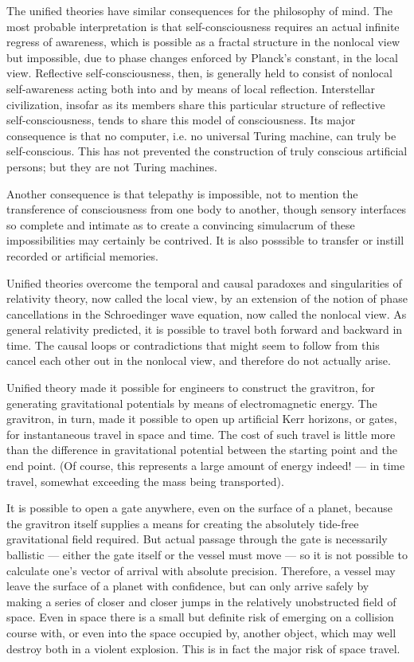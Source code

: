 \documentclass[english,11pt,letterpaper,onecolumn]{scrbook}
\begin{document}
	The unified theories have similar consequences for the philosophy of mind.  The most probable interpretation is that self-consciousness requires an actual infinite regress of awareness, which is possible as a fractal structure in the nonlocal view but impossible, due to phase changes enforced by Planck's constant, in the local view.  Reflective self-consciousness, then, is generally held to consist of nonlocal self-awareness acting both into and by means of local reflection.  Interstellar civilization, insofar as its members share this particular structure of reflective self-consciousness, tends to share this model of consciousness.  Its major consequence is that no computer, i.e. no universal Turing machine, can truly be self-conscious.  This has not prevented the construction of truly conscious artificial persons; but they are not Turing machines.  

	Another consequence is that telepathy is impossible, not to mention the transference of consciousness from one body to another, though sensory interfaces so complete and intimate as to create a convincing simulacrum of these impossibilities may certainly be contrived.  It is also posssible to transfer or instill recorded or artificial memories.

	Unified theories overcome the temporal and causal paradoxes and singularities of relativity theory, now called the local view, by an extension of the notion of phase cancellations in the Schroedinger wave equation, now called the nonlocal view.  As general relativity predicted, it is possible to travel both forward and backward in time.  The causal loops or contradictions that might seem to follow from this cancel each other out in the nonlocal view, and therefore do not actually arise.

	Unified theory made it possible for engineers to construct the gravitron, for generating gravitational potentials by means of electromagnetic energy.  The gravitron, in turn, made it possible to open up artificial Kerr horizons, or gates, for instantaneous travel in space and time.  The cost of such travel is little more than the difference in gravitational potential between the starting point and the end point.  (Of course, this represents a large amount of energy indeed! --- in time travel, somewhat exceeding the mass being transported).

	It is possible to open a gate anywhere, even on the surface of a planet, because the gravitron itself supplies a means for creating the absolutely tide-free gravitational field required.  But actual passage through the gate is necessarily ballistic --- either the gate itself or the vessel must move --- so it is not possible to calculate one's vector of arrival with absolute precision.  Therefore, a vessel may leave the surface of a planet with confidence, but can only arrive safely by making a series of closer and closer jumps in the relatively unobstructed field of space.  Even in space there is a small but definite risk of emerging on a collision course with, or even into the space occupied by, another object, which may well destroy both in a violent explosion.  This is in fact the major risk of space travel.
\end{document}
